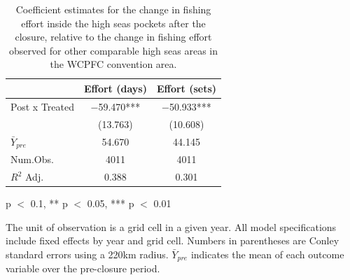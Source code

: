 \begin{table}
\centering
\begin{threeparttable}
\caption{\label{tab:h1}Coefficient estimates for the change in fishing effort inside
             the high seas pockets after the closure, relative to the change in fishing effort
             observed for other comparable high seas areas in the WCPFC convention area.}
\centering
\begin{tabular}[t]{lcc}
\toprule
  & Effort (days) & Effort (sets)\\
\midrule
Post x Treated & \num{-59.470}*** & \num{-50.933}***\\
 & (\num{13.763}) & (\num{10.608})\\
$\bar{Y}_{pre}$ & \num{54.670} & \num{44.145}\\
\midrule
Num.Obs. & \num{4011} & \num{4011}\\
$R^2$ Adj. & \num{0.388} & \num{0.301}\\
\bottomrule
\end{tabular}
\begin{tablenotes}
\small
\item * p $<$ 0.1, ** p $<$ 0.05, *** p $<$ 0.01
\item The unit of observation is a grid cell in a given year. All model specifications include fixed effects by year and grid cell. Numbers in parentheses are Conley standard errors using a 220km radius. $\bar{Y}_{pre}$ indicates the mean of each outcome variable over the pre-closure period.
\end{tablenotes}
\end{threeparttable}
\end{table}
